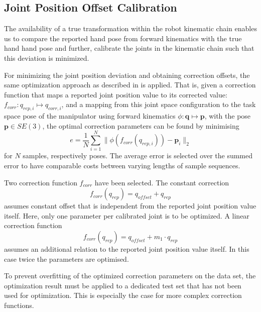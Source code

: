 \subsection{Joint Position Offset Calibration}

The availability of a true transformation within the robot kinematic chain enables us to compare the reported hand pose from forward kinematics with the true hand hand pose and further, calibrate the joints in the kinematic chain such that this deviation is minimized.

For minimizing the joint position deviation and obtaining correction offsets, the same optimization approach as described in \cite{Fallon2015} is applied. That is, given a correction function that maps a reported joint position value to its corrected value: $f_{corr}: q_{rep,i} \mapsto q_{corr,i}$, and a mapping from this joint space configuration to the 	task space pose of the manipulator using forward kinematics $\phi: \mathbf{q} \mapsto \mathbf{p}$, with the pose $\mathbf{p} \in SE(3)$, the optimal correction parameters can be found by minimising
\begin{equation}
e = \frac{1}{N} \sum_{i=1}^N  \lVert \phi \left( f_{corr}(q_{rep,i}) \right) - \mathbf{p}_i \rVert_2
\end{equation}
for $N$ samples, respectively poses. The average error is selected over the summed error to have comparable costs between varying lengths of sample sequences.

Two correction function $f_{corr}$ have been selected. The constant correction
\begin{equation}
f_{corr}(q_{rep}) = q_{offset} + q_{rep}
\end{equation}
assumes constant offset that is independent from the reported joint position value itself. Here, only one parameter per calibrated joint is to be optimized. A linear correction function
\begin{equation}
f_{corr}(q_{rep}) = q_{offset} + m_1 \cdot q_{rep}
\end{equation}
assumes an additional relation to the reported joint position value itself. In this case twice the parameters are optimised.

To prevent overfitting of the optimized correction parameters on the data set, the optimization result must be applied to a dedicated test set that has not been used for optimization. This is especially the case for more complex correction functions.

